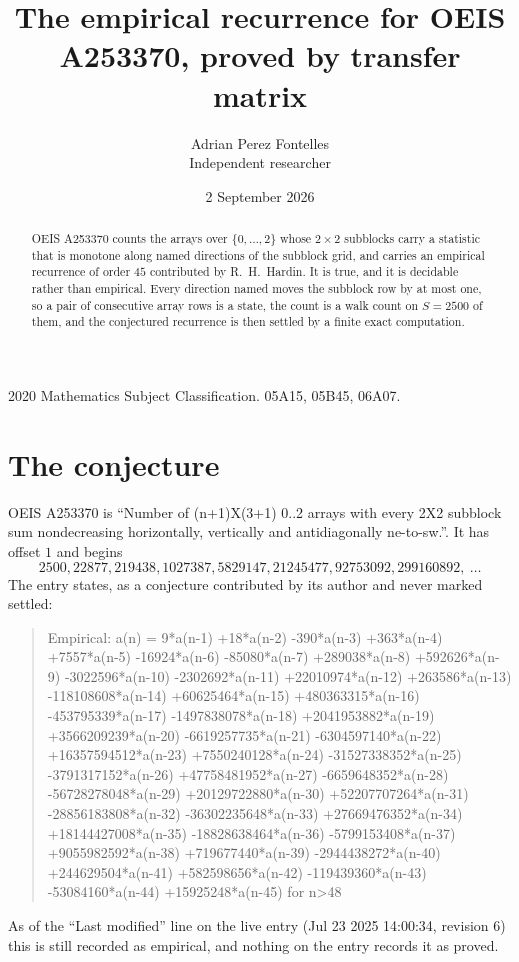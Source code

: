 \documentclass[11pt,a4paper]{article}
\title{The empirical recurrence for OEIS A253370, proved by transfer matrix}
\author{Adrian Perez Fontelles\\ \small Independent researcher}
\date{2 September 2026}
\theoremstyle{plain}
\theoremstyle{definition}
\begin{document}
\maketitle

\begin{abstract}
OEIS A253370 counts the arrays over $\{0,\dots,2\}$ whose $2\times2$ subblocks carry a
statistic that is monotone along named directions of the subblock grid, and carries an
empirical recurrence of order $45$ contributed by R.~H.~Hardin. It is true, and it is
decidable rather than empirical. Every direction named moves the subblock row by at most one,
so a pair of consecutive array rows is a state, the count is a walk count on $S=2500$ of them,
and the conjectured recurrence is then settled by a finite exact computation.
\end{abstract}

\noindent\small 2020 Mathematics Subject Classification. 05A15, 05B45, 06A07.\normalsize

\section{The conjecture}

OEIS A253370 is ``Number of (n+1)X(3+1) 0..2 arrays with every 2X2 subblock sum nondecreasing horizontally, vertically and antidiagonally ne-to-sw.''. It has offset $1$ and begins
\[
2500, 22877, 219438, 1027387, 5829147, 21245477, 92753092, 299160892,\ \dots
\]
The entry states, as a conjecture contributed by its author and never marked settled:
\begin{quote}
Empirical: a(n) = 9*a(n-1) +18*a(n-2) -390*a(n-3) +363*a(n-4) +7557*a(n-5) -16924*a(n-6) -85080*a(n-7) +289038*a(n-8) +592626*a(n-9) -3022596*a(n-10) -2302692*a(n-11) +22010974*a(n-12) +263586*a(n-13) -118108608*a(n-14) +60625464*a(n-15) +480363315*a(n-16) -453795339*a(n-17) -1497838078*a(n-18) +2041953882*a(n-19) +3566209239*a(n-20) -6619257735*a(n-21) -6304597140*a(n-22) +16357594512*a(n-23) +7550240128*a(n-24) -31527338352*a(n-25) -3791317152*a(n-26) +47758481952*a(n-27) -6659648352*a(n-28) -56728278048*a(n-29) +20129722880*a(n-30) +52207707264*a(n-31) -28856183808*a(n-32) -36302235648*a(n-33) +27669476352*a(n-34) +18144427008*a(n-35) -18828638464*a(n-36) -5799153408*a(n-37) +9055982592*a(n-38) +719677440*a(n-39) -2944438272*a(n-40) +244629504*a(n-41) +582598656*a(n-42) -119439360*a(n-43) -53084160*a(n-44) +15925248*a(n-45) for n>48
\end{quote}
As of the ``Last modified'' line on the live entry (Jul 23 2025 14:00:34, revision 6) this is still
recorded as empirical, and nothing on the entry records it as proved.
\end{document}
